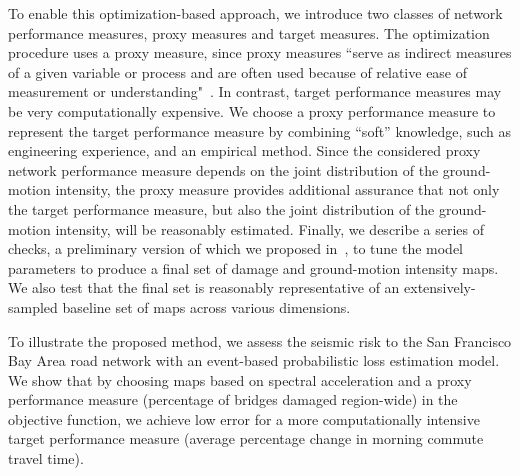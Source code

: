 To enable this optimization-based approach, we introduce two classes of network performance measures, proxy measures and target measures. The optimization procedure uses a proxy measure, since proxy measures ``serve as indirect measures of a given variable or process and are often used because of relative ease of measurement or understanding"~\cite{mckay_metric_2010}.  In contrast, target performance measures may be very computationally expensive. We choose a proxy performance measure to represent the target performance measure by combining ``soft'' knowledge, such as engineering experience, and an empirical method. Since the considered proxy network performance measure depends on the joint distribution of the ground-motion intensity, the proxy measure provides additional assurance that not only the target performance measure, but also the joint distribution of the ground-motion intensity, will be reasonably estimated. 
% 
 Finally, we describe a series of checks, a preliminary version of which we proposed in~\cite{miller_framework_2014}, to tune the model parameters to produce a final set of damage and ground-motion intensity maps. We also test that the final set is reasonably representative of an extensively-sampled baseline set of maps across various dimensions.
 
To illustrate the proposed method, we assess the seismic risk to the San Francisco Bay Area road network with an event-based probabilistic loss estimation model. We show that by choosing maps based on spectral acceleration and a proxy performance measure (percentage of bridges damaged region-wide) in the objective function, we achieve low error for a more computationally intensive target performance measure (average percentage change in morning commute travel time). 

